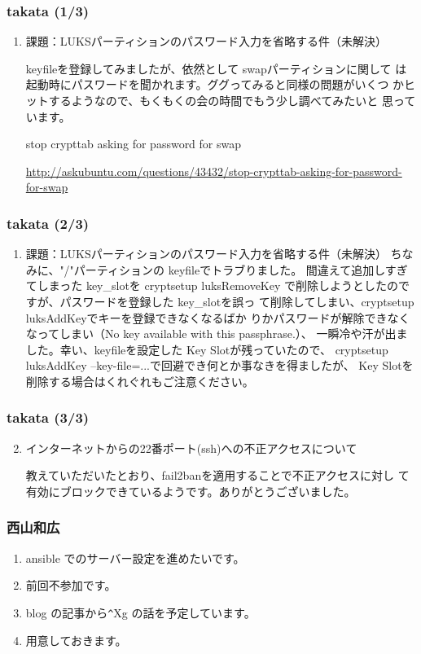 \documentclass[cjk,dvipdfmx,10pt,compress,%
hyperref={bookmarks=true,bookmarksnumbered=true,bookmarksopen=false,%
colorlinks=false,%
pdftitle={第 85 回 関西 Debian 勉強会},%
pdfauthor={倉敷・のがた・佐々木・かわだ・八津尾},%
pdfsubject={資料},%
}]{beamer}
\begin{document}
\begin{frame}
  \frametitle{ takata (1/3)}
  \begin{enumerate}
  \item 課題：LUKSパーティションのパスワード入力を省略する件（未解決）

    keyfileを登録してみましたが、依然として swapパーティションに関して
    は起動時にパスワードを聞かれます。ググってみると同様の問題がいくつ
    かヒットするようなので、もくもくの会の時間でもう少し調べてみたいと
    思っています。

    stop crypttab asking for password for swap

    \url{http://askubuntu.com/questions/43432/stop-crypttab-asking-for-password-for-swap}
  \end{enumerate}
\end{frame}

\begin{frame}
  \frametitle{ takata (2/3)}
  \begin{enumerate}
  \item 課題：LUKSパーティションのパスワード入力を省略する件（未解決）
    ちなみに、"/"パーティションの keyfileでトラブりました。
    間違えて追加しすぎてしまった key\_{}slotを cryptsetup luksRemoveKey
    で削除しようとしたのですが、パスワードを登録した key\_{}slotを誤っ
    て削除してしまい、cryptsetup luksAddKeyでキーを登録できなくなるばか
    りかパスワードが解除できなくなってしまい（No key available with this passphrase.）、
    一瞬冷や汗が出ました。幸い、keyfileを設定した Key Slotが残っていたので、
    cryptsetup luksAddKey --key-file=...で回避でき何とか事なきを得ましたが、
    Key Slotを削除する場合はくれぐれもご注意ください。
  \end{enumerate}
\end{frame}

\begin{frame}
  \frametitle{ takata (3/3)}
  \begin{enumerate}
    \setcounter{enumi}{1}
  \item インターネットからの22番ポート(ssh)への不正アクセスについて

    教えていただいたとおり、fail2banを適用することで不正アクセスに対し
    て有効にブロックできているようです。ありがとうございました。
  \end{enumerate}
\end{frame}

\begin{frame}[containsverbatim]
  \frametitle{ 西山和広 }
  \begin{enumerate}
  \item ansible でのサーバー設定を進めたいです。
  \item 前回不参加です。
  \item blog の記事から\verb+^+Xg の話を予定しています。
  \item 用意しておきます。
  \end{enumerate}
\end{frame}
\end{document}
